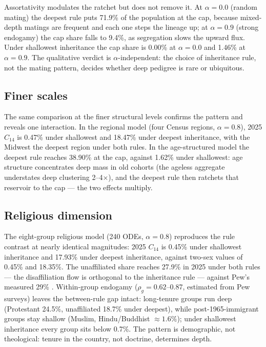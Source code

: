 \documentclass[11pt,a4paper]{article}
\begin{document}
Assortativity modulates the ratchet but does not remove it.  At
$\alpha=0.0$ (random mating) the deepest rule puts 71.9\% of the
population at the cap, because mixed-depth matings are frequent and
each one steps the lineage up; at $\alpha=0.9$ (strong endogamy) the
cap share falls to 9.4\%, as segregation slows the upward flux.  Under
shallowest inheritance the cap share is 0.00\% at $\alpha=0.0$ and
1.46\% at $\alpha=0.9$.  The qualitative verdict is
$\alpha$-independent: the choice of inheritance rule, not the mating
pattern, decides whether deep pedigree is rare or ubiquitous.

\subsection{Finer scales}
\label{sec:scales}
The same comparison at the finer structural levels confirms the
pattern and reveals one interaction.  In the regional model (four
Census regions, $\alpha=0.8$), 2025 $C_{14}$ is 0.47\% under
shallowest and 18.47\% under deepest inheritance, with the Midwest the
deepest region under both rules.  In the age-structured model the
deepest rule reaches 38.90\% at the cap, against 1.62\% under
shallowest: age structure concentrates deep mass in old cohorts
(the ageless aggregate understates deep clustering 2--4$\times$), and
the deepest rule then ratchets that reservoir to the cap --- the two
effects multiply.

\subsection{Religious dimension}
\label{sec:religious-results}
The eight-group religious model (240 ODEs, $\alpha=0.8$) reproduces the
rule contrast at nearly identical magnitudes: 2025 $C_{14}$ is 0.45\%
under shallowest inheritance and 17.93\% under deepest
inheritance, against two-sex values of 0.45\% and 18.35\%.  The
unaffiliated share reaches 27.9\% in 2025 under both rules --- the
disaffiliation flow is orthogonal to the inheritance rule --- against
Pew's measured 29\% \cite{pew-rls-2025}.  Within-group endogamy
($\rho_g=0.62$--0.87, estimated from Pew surveys) leaves the
between-rule gap intact: long-tenure groups run deep (Protestant
24.5\%, unaffiliated 18.7\% under deepest), while post-1965-immigrant
groups stay shallow (Muslim, Hindu/Buddhist $\approx 1.6\%$); under
shallowest inheritance every group sits below 0.7\%.  The pattern is
demographic, not theological: tenure in the country, not doctrine,
determines depth.
\end{document}
